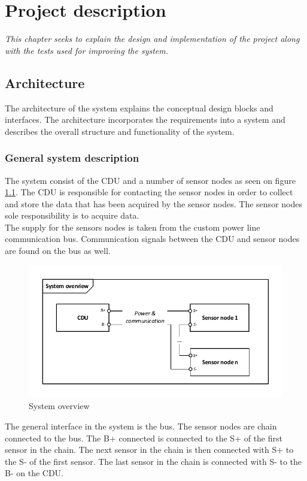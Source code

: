 \chapter{Project description}
\textit{This chapter seeks to explain the design and implementation of the project along with the tests used for improving the system.}
\section{Architecture}
The architecture of the system explains the conceptual design blocks and interfaces. The architecture incorporates the requirements into a system and describes the overall structure and functionality of the system. 

\subsection{General system description}
The system consist of the CDU and a number of sensor nodes as seen on figure \ref{fig:systembdd}. The CDU is responsible for contacting the sensor nodes in order to collect and store the data that has been acquired by the sensor nodes. The sensor nodes sole responsibility is to acquire data.\\
The supply for the sensors nodes is taken from the custom power line communication bus. Communication signals between the CDU and sensor nodes are found on the bus as well. 
\begin{figure}[H]
	\centering
	\includegraphics[width=.9\textwidth]{billeder/11ProjectDescription/systembdd}
	\caption{System overview}
	\label{fig:systembdd}
\end{figure}
The general interface in the system is the bus. The sensor nodes are chain connected to the bus. The B+ connected is connected to the S+ of the first sensor in the chain. The next sensor in the chain is then connected with S+ to the S- of the first sensor. The last sensor in the chain is connected with S- to the B- on the CDU.\\
